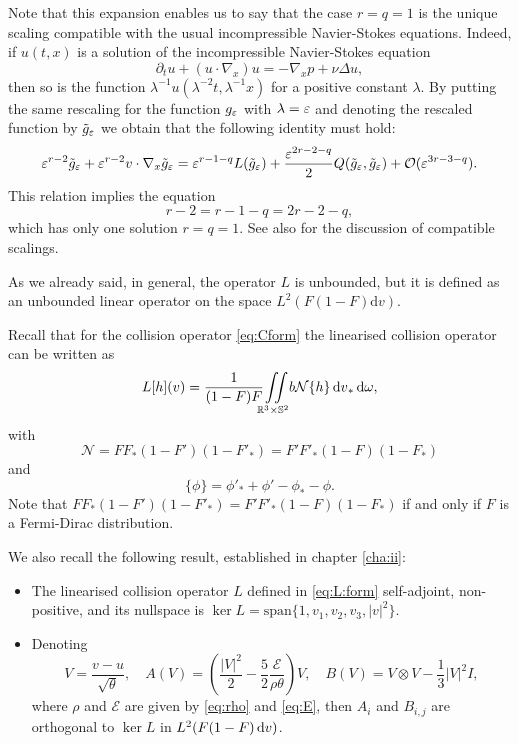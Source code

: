  Note that this expansion enables us to say that the case $r=q=1$ is the unique scaling compatible with the usual incompressible Navier-Stokes equations.  
  Indeed, if $u(t,x)$ is a solution of the incompressible Navier-Stokes equation \[ \partial_t u+(u\cdot\nabla_x)u=-\nabla_xp+\nu \Delta u,\] then so is the function $ \lambda^{-1} u(\lambda^{-2}t,\lambda^{-1}x)$ for a positive constant $\lambda$.
By putting the same rescaling for the function  $g_{\varepsilon} $ with $\lambda={\varepsilon}$ and denoting the rescaled function by $\tilde g_{\varepsilon}$ we obtain that the following identity must hold:
\[{\varepsilon}^{r-2}\tilde g_{\varepsilon} +{\varepsilon}^{r-2} v\cdot\nabla_x \tilde g_{\varepsilon} = {\varepsilon}^{r-1-q}L(\tilde g_{\varepsilon})+\frac {{\varepsilon}^{2r-2-q}}{2}Q(\tilde g_{\varepsilon},\tilde g_{\varepsilon}) +\mathcal O({\varepsilon} ^{3r-3-q}). \]
This relation implies the equation \[r-2=r-1-q=2r-2-q,\]which has only one solution $r=q=1$. See also \cite{bouchut2000kinetic,de1989incompressible} for the discussion of compatible scalings.

As we already said, in general, the operator $L$ is unbounded, but it is defined as an unbounded linear operator on the space $L^2(F(1-F)\mathrm dv)$. 

Recall that for the collision operator \eqref{eq:Cform} the linearised collision operator can be written as
   \begin{equation*}%
   	L[h](v)=\frac{1}{ (1-F)F }\col b\mathcal N \{h \} \dv_\ast\dom ,
   \end{equation*}
with\[\mathcal N = FF_\ast(1-F')(1-F'_\ast)=F'F'_\ast(1-F)(1-F_\ast)\]
and\[\{\phi\}=\phi'_\ast+\phi'-\phi_\ast-\phi.\]
Note that $FF_\ast(1-F')(1-F'_\ast)=F'F'_\ast(1-F)(1-F_\ast)$ if and only if $F$ is a Fermi-Dirac distribution.

We also recall the following result, established in chapter \ref{cha:ii}:
\begin{theorem*}  \begin{itemize}
\item 
  The linearised collision operator $L$ defined in \eqref{eq:L:form} self-ad\-joint, non-positive, and its nullspace is $\ker L = \mbox{span}\{1,v_1,v_2,v_3,|v|^2\}$. 
 \item 
Denoting \[V=\frac{v-u}{\sqrt\theta}, \quad A(V)=\left(\frac{|V|^2}{2}-\frac52   \frac{\mathcal E}{\rho\theta}\right)V,\quad B(V)=V\otimes V-\frac 13 |V|^2I,\]
where $\rho$ and $\mathcal E$ are given by \eqref{eq:rho} and \eqref{eq:E}, then $A_i$ and
$B_{i,j}$   are orthogonal to $\ker L$ in $L^2(F(1-F) {\,\mathrm{d} v})$.\end{itemize}
\end{theorem*}

